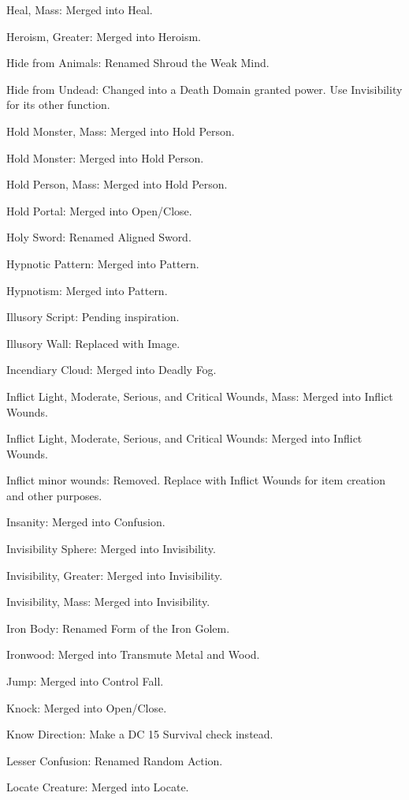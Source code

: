 {\begin{list}{}{\leftmargin=1em}
 \item Heal, Mass: Merged into Heal.
 \item Heroism, Greater: Merged into Heroism.
 \item Hide from Animals: Renamed Shroud the Weak Mind.
 \item Hide from Undead: Changed into a Death Domain granted power. Use Invisibility for its other function.
 \item Hold Monster, Mass: Merged into Hold Person.
 \item Hold Monster: Merged into Hold Person.
 \item Hold Person, Mass: Merged into Hold Person.
 \item Hold Portal: Merged into Open/Close.
 \item Holy Sword: Renamed Aligned Sword.
 \item Hypnotic Pattern: Merged into Pattern.
 \item Hypnotism: Merged into Pattern.
 \item Illusory Script: Pending inspiration.
 \item Illusory Wall: Replaced with Image. 
 \item Incendiary Cloud: Merged into Deadly Fog.
 \item Inflict Light, Moderate, Serious, and Critical Wounds, Mass: Merged into Inflict Wounds.
 \item Inflict Light, Moderate, Serious, and Critical Wounds: Merged into Inflict Wounds.
 \item Inflict minor wounds: Removed. Replace with Inflict Wounds for item creation and other purposes.
 \item Insanity: Merged into Confusion.
 \item Invisibility Sphere: Merged into Invisibility.
 \item Invisibility, Greater: Merged into Invisibility.
 \item Invisibility, Mass: Merged into Invisibility.
 \item Iron Body: Renamed Form of the Iron Golem.
 \item Ironwood: Merged into Transmute Metal and Wood.
 \item Jump: Merged into Control Fall.
 \item Knock: Merged into Open/Close.
 \item Know Direction: Make a DC 15 Survival check instead.
 \item Lesser Confusion: Renamed Random Action.
 \item Locate Creature: Merged into Locate.

\end{list}}
